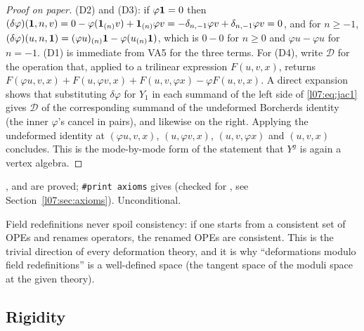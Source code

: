 \begin{proof}[Proof on paper]
(D2) and (D3): if $\varphi\mathbf{1} = 0$ then $(\delta\varphi)(\mathbf{1},n,v) = 0 - \varphi(\mathbf{1}_{(n)}v)
+ \mathbf{1}_{(n)}\varphi v = -\delta_{n,-1}\varphi v + \delta_{n,-1}\varphi v = 0$, and for $n\ge-1$,
$(\delta\varphi)(u,n,\mathbf{1}) = (\varphi u)_{(n)}\mathbf{1} - \varphi(u_{(n)}\mathbf{1})$, which is
$0-0$ for $n\ge0$ and $\varphi u - \varphi u$ for $n=-1$. (D1) is immediate from VA5 for the three
terms. For (D4), write $\mathcal{D}$ for the operation that, applied to a trilinear expression
$F(u,v,x)$, returns $F(\varphi u,v,x)+F(u,\varphi v,x)+F(u,v,\varphi x)-\varphi F(u,v,x)$. A direct
expansion shows that substituting $\delta\varphi$ for $Y_1$ in each summand of the left side of
\eqref{l07:eq:jac1} gives $\mathcal{D}$ of the corresponding summand of the undeformed Borcherds
identity (the inner $\varphi$'s cancel in pairs), and likewise on the right. Applying the undeformed
identity at $(\varphi u,v,x)$, $(u,\varphi v,x)$, $(u,v,\varphi x)$ and $(u,v,x)$ concludes. This is the
mode-by-mode form of the statement that $Y^g$ is again a vertex algebra.
\end{proof}

\begin{status}
,  and
 are proved; \texttt{\#print axioms} gives
 (checked for , see
Section~\ref{l07:sec:axioms}). Unconditional.
\end{status}

\begin{physics}
Field redefinitions never spoil consistency: if one starts from a consistent set of OPEs and renames
operators, the renamed OPEs are consistent. This is the trivial direction of every deformation theory,
and it is why ``deformations modulo field redefinitions'' is a well-defined space (the tangent space of the
moduli space at the given theory).
\end{physics}

\subsection{Rigidity}

